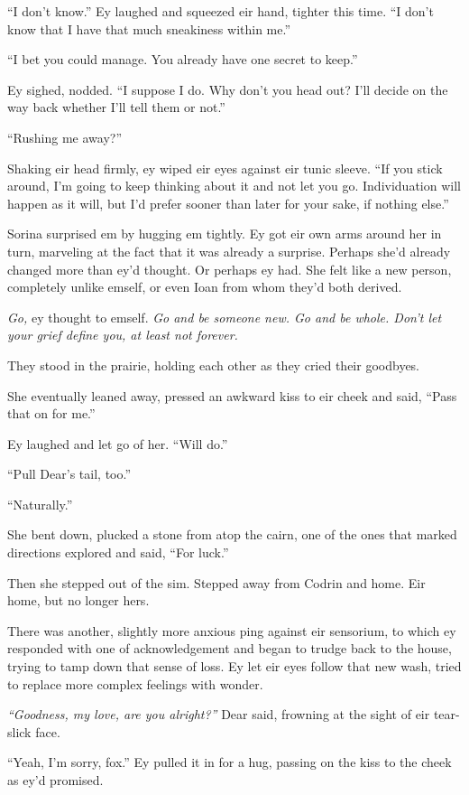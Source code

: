 ``I don't know.'' Ey laughed and squeezed eir hand, tighter this time. ``I don't know that I have that much sneakiness within me.''

``I bet you could manage. You already have one secret to keep.''

Ey sighed, nodded. ``I suppose I do. Why don't you head out? I'll decide on the way back whether I'll tell them or not.''

``Rushing me away?''

Shaking eir head firmly, ey wiped eir eyes against eir tunic sleeve. ``If you stick around, I'm going to keep thinking about it and not let you go. Individuation will happen as it will, but I'd prefer sooner than later for your sake, if nothing else.''

Sorina surprised em by hugging em tightly. Ey got eir own arms around her in turn, marveling at the fact that it was already a surprise. Perhaps she'd already changed more than ey'd thought. Or perhaps ey had. She felt like a new person, completely unlike emself, or even Ioan from whom they'd both derived.

\emph{Go,} ey thought to emself. \emph{Go and be someone new. Go and be whole. Don't let your grief define you, at least not forever.}

They stood in the prairie, holding each other as they cried their goodbyes.

She eventually leaned away, pressed an awkward kiss to eir cheek and said, ``Pass that on for me.''

Ey laughed and let go of her. ``Will do.''

``Pull Dear's tail, too.''

``Naturally.''

She bent down, plucked a stone from atop the cairn, one of the ones that marked directions explored and said, ``For luck.''

Then she stepped out of the sim. Stepped away from Codrin and home. Eir home, but no longer hers.

There was another, slightly more anxious ping against eir sensorium, to which ey responded with one of acknowledgement and began to trudge back to the house, trying to tamp down that sense of loss. Ey let eir eyes follow that new wash, tried to replace more complex feelings with wonder.

\emph{``Goodness, my love, are you alright?''} Dear said, frowning at the sight of eir tear-slick face.

``Yeah, I'm sorry, fox.'' Ey pulled it in for a hug, passing on the kiss to the cheek as ey'd promised.

